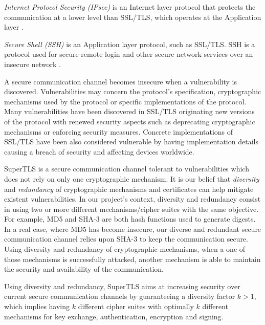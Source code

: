 \documentclass{sig-alternate-05-2015}
\begin{document}
\textit{Internet Protocol Security (IPsec)} is an Internet layer protocol that protects the communication at a lower level than SSL/TLS, which operates at the Application layer \cite{IPsec}.

\textit{Secure Shell (SSH)} is an Application layer protocol, such as SSL/TLS. SSH is a protocol used for secure remote login and other secure network services over an insecure network \cite{SSH}.

A secure communication channel becomes insecure when a vulnerability is discovered. Vulnerabilities may concern the protocol's specification, cryptographic mechanisms used by the protocol or specific implementations of the protocol. Many vulnerabilities have been discovered in SSL/TLS originating new versions of the protocol with renewed security aspects such as deprecating cryptographic mechanisms or enforcing security measures.
Concrete implementations of SSL/TLS have been also considered vulnerable by having implementation details causing a breach of security and affecting devices worldwide.

SuperTLS is a secure communication channel tolerant to vulnerabilities which does not rely on only one cryptographic mechanism. It is our belief that \textit{diversity} and \textit{redundancy} of cryptographic mechanisms and certificates can help mitigate existent vulnerabilities.
In our project's context, diversity and redundancy consist in using two or more different mechanisms/cipher suites with the same objective. For example, MD5 and SHA-3 are both hash functions used to generate digests. In a real case, where MD5 has become insecure, our diverse and redundant secure communication channel relies upon SHA-3 to keep the communication secure. Using diversity and redundancy of cryptographic mechanisms, when a one of those mechanisms is successfully attacked, another mechanism is able to maintain the security and availability of the communication.


Using diversity and redundancy, SuperTLS aims at increasing security over current secure communication channels by guaranteeing a diversity factor $k > 1$, which implies having $k$ different cipher suites with optimally $k$ different mechanisms for key exchange, authentication, encryption and signing.
\end{document}
